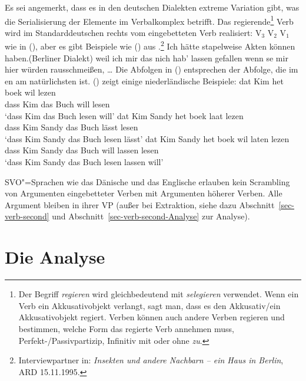 Es sei angemerkt, dass es in den deutschen Dialekten extreme Variation gibt, was die Serialisierung
der Elemente im Verbalkomplex betrifft. Das regierende\footnote{
  Der Begriff \emph{regieren} wird gleichbedeutend mit \emph{selegieren} verwendet. Wenn ein Verb ein Akkusativobjekt verlangt, sagt man, dass es den Akkusativ/ein Akkusativobjekt regiert. Verben können auch andere Verben regieren
  und bestimmen, welche Form das regierte Verb annehmen muss, \zb Perfekt-/Passivpartizip, Infinitiv
  mit oder ohne \emph{zu}.
} Verb wird im Standard\-deutschen rechts vom
eingebetteten Verb realisiert: V$_3$ V$_2$ V$_1$ wie in (), aber es gibt Beispiele wie
() aus .\footnote{
Interviewpartner in: \emph{Insekten und andere Nachbarn -- ein Haus in Berlin}, ARD 15.11.1995.
}
\eal
\ex
Ich hätte stapelweise Akten können haben.\hfill (Berliner Dialekt)
\ex
weil ich mir das  nich hab' lassen gefallen
\ex
wenn se   mir hier würden rausschmeißen, \ldots
\zl
Die Abfolgen in () entsprechen der Abfolge, die im en am natürlichsten ist. () zeigt einige
niederländische Beispiele:
\eal
\ex
\gll dat   Kim het boek wil lezen\\
     dass  Kim das Buch will lesen\\
\glt `dass Kim das Buch lesen will'
\ex
\gll dat  Kim Sandy het boek laat lezen\\
     dass Kim Sandy das Buch lässt lesen\\
\glt `dass Kim Sandy das Buch lesen lässt'
\ex
\gll dat Kim Sandy het boek wil laten lezen\\
     dass Kim Sandy das Buch will lassen lesen\\
\glt `dass Kim Sandy das Buch lesen lassen will'
\zl

\noindent
SVO"=Sprachen wie das Dänische und das Englische erlauben kein Scrambling
von Argumenten eingebetteter Verben mit Argumenten höherer Verben. Alle Argument bleiben in ihrer VP (außer bei
Extraktion, siehe dazu Abschnitt~\ref{sec-verb-second} und Abschnitt~\ref{sec-verb-second-Analyse} zur Analyse).


\section{Die Analyse}


